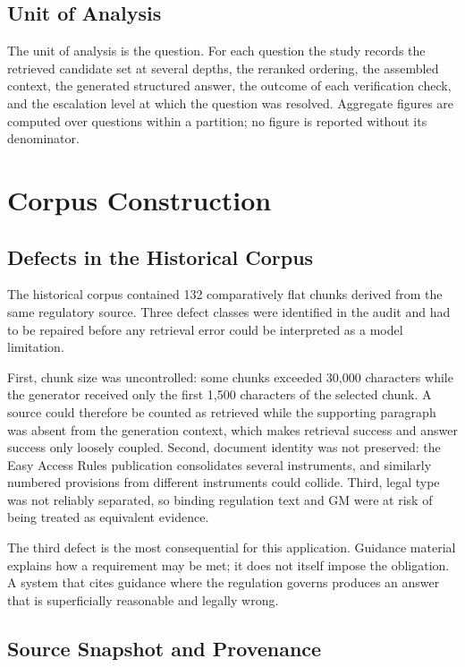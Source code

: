 \subsection{Unit of Analysis}

The unit of analysis is the question. For each question the study records the retrieved candidate set at several depths, the reranked ordering, the assembled context, the generated structured answer, the outcome of each verification check, and the escalation level at which the question was resolved. Aggregate figures are computed over questions within a partition; no figure is reported without its denominator.

\section{Corpus Construction}
\label{sec:method-corpus}

\subsection{Defects in the Historical Corpus}

The historical corpus contained 132 comparatively flat chunks derived from the same regulatory source. Three defect classes were identified in the audit and had to be repaired before any retrieval error could be interpreted as a model limitation.

First, chunk size was uncontrolled: some chunks exceeded 30{,}000 characters while the generator received only the first 1{,}500 characters of the selected chunk. A source could therefore be counted as retrieved while the supporting paragraph was absent from the generation context, which makes retrieval success and answer success only loosely coupled. Second, document identity was not preserved: the Easy Access Rules publication consolidates several instruments, and similarly numbered provisions from different instruments could collide. Third, legal type was not reliably separated, so binding regulation text and \ac{GM} were at risk of being treated as equivalent evidence.

The third defect is the most consequential for this application. Guidance material explains how a requirement may be met; it does not itself impose the obligation. A system that cites guidance where the regulation governs produces an answer that is superficially reasonable and legally wrong.

\subsection{Source Snapshot and Provenance}

